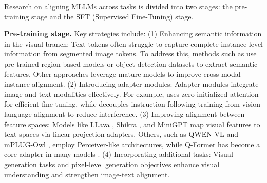 Research on aligning MLLMs across tasks is divided into two stages: the pre-training stage and the SFT (Supervised Fine-Tuning) stage. 

\textbf{Pre-training stage.} Key strategies include:  
(1) Enhancing semantic information in the visual branch: Text tokens often struggle to capture complete instance-level information from segmented image tokens. To address this, methods such as \cite{zhong2022regionclip, minderer2022simple} use pre-trained region-based models or object detection datasets to extract semantic features. Other approaches \cite{lai2024lisa, yang2023improved, aflalo2024fivl, zhao2023bubogpt} leverage mature models \cite{radford2021learning} to improve cross-modal instance alignment.  
(2) Introducing adapter modules: Adapter modules integrate image and text modalities effectively. For example, \cite{zhang2023llama} uses zero-initialized attention for efficient fine-tuning, while \cite{gao2023llama} decouples instruction-following training from vision-language alignment to reduce interference.  
(3) Improving alignment between feature spaces: Models like LLava \cite{liu2024visual}, Shikra \cite{chen2023shikra}, and MiniGPT \cite{chen2023minigpt} map visual features to text spaces via linear projection adapters. Others, such as QWEN-VL \cite{bai2023qwen} and mPLUG-Owl \cite{ye2023mplug}, employ Perceiver-like architectures, while Q-Former \cite{li2023blip} has become a core adapter in many models \cite{zhu2023minigpt, yu2023reformulating}.  
(4) Incorporating additional tasks: Visual generation tasks \cite{tong2024metamorph} and pixel-level generation objectives \cite{fini2024multimodal} enhance visual understanding and strengthen image-text alignment.  

